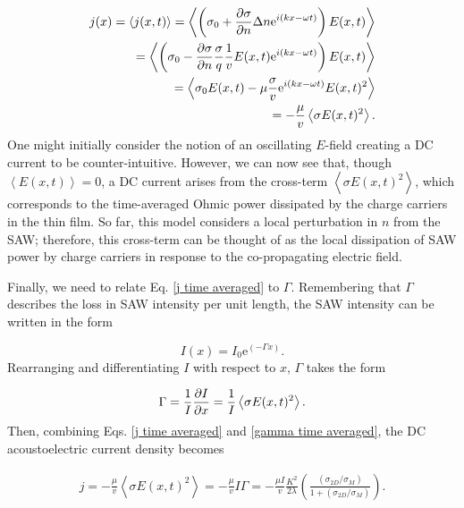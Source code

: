 \documentclass[double,12pt,1in]{beavtex}
\begin{document}
\begin{equation}
    \begin{split}
        j(x) = \left\langle j(x,t) \right\rangle = \left\langle \left( \sigma_0 + \pdv{\sigma}{n}\Delta n \mathrm{e}^{i(kx - \omega t)} \right) E(x,t) \right\rangle \\
        = \left\langle \left( \sigma_0 - \pdv{\sigma}{n}\frac{\sigma}{q} \frac{1}{v}E(x,t) \mathrm{e}^{i(kx - \omega t)} \right) E(x,t)  \right\rangle \\
        = \left\langle \sigma_0 E(x,t) - \mu  \frac{\sigma}{v} \mathrm{e}^{i(kx - \omega t)}E(x,t)^2 \right\rangle \\
        = - \frac{\mu}{v}\left\langle\sigma E(x,t)^2\right\rangle. 
    \end{split}
    \label{j time averaged}
\end{equation}
One might initially consider the notion of an oscillating $E$-field creating a DC current to be counter-intuitive. However, we can now see that, though $\left\langle E(x,t) \right\rangle = 0$, a DC current arises from the cross-term $\left\langle \sigma E(x,t)^2 \right\rangle$, which corresponds to the time-averaged Ohmic power dissipated by the charge carriers in the thin film. So far, this model considers a local perturbation in $n$ from the SAW; therefore, this cross-term can be thought of as the local dissipation of SAW power by charge carriers in response to the co-propagating electric field. 

Finally, we need to relate Eq. \ref{j time averaged} to $\Gamma$. Remembering that $\Gamma$ describes the loss in SAW intensity per unit length, the SAW intensity can be written in the form

\begin{equation}
    I(x) = I_0 \mathrm{e}^{(-\Gamma x)}.
\end{equation}
Rearranging and differentiating $I$ with respect to $x$, $\Gamma$ takes the form

\begin{equation}
    \Gamma = \frac{1}{I} \pdv{I}{x} = \frac{1}{I}\left\langle\sigma E(x,t)^2\right\rangle. \label{gamma time averaged}
\end{equation}
Then, combining Eqs. \ref{j time averaged} and \ref{gamma time averaged}, the DC acoustoelectric current density becomes

\begin{equation}
    \begin{split}
        j = - \frac{\mu}{v}\left\langle\sigma E(x,t)^2\right\rangle = - \frac{\mu}{v} I\Gamma = - \frac{\mu I}{v} \frac{K^2}{2\lambda}(\frac{(\sigma_{2D}/\sigma_M)}{1+(\sigma_{2D}/\sigma_M)}). 
    \end{split}
    \label{J_2D}
\end{equation}
\end{document}
